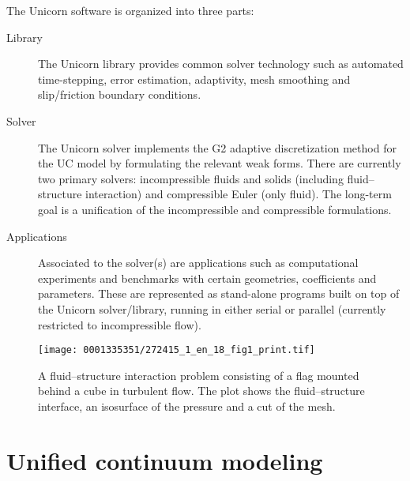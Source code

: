 
The Unicorn software is organized into three parts:
\begin{description}
\item[Library] The Unicorn library provides common solver technology
  such as automated time-stepping, error estimation, adaptivity, mesh
  smoothing and slip/friction boundary conditions.

\item[Solver] The Unicorn solver implements the G2 adaptive
  discretization method for the UC model by formulating the relevant
  weak forms. There are currently two primary solvers: incompressible
  fluids and solids (including fluid--structure interaction) and
  compressible Euler (only fluid). The long-term goal is a
  unification of the incompressible and compressible formulations.

\item[Applications] Associated to the solver(s) are applications such
  as computational experiments and benchmarks with certain geometries,
  coefficients and parameters. These are represented as stand-alone
  programs built on top of the Unicorn solver/library, running in
  either serial or parallel (currently restricted to incompressible
  flow).
\end{description}


\begin{figure}[!t]
\centering
\texttt{[image: 0001335351/272415\_1\_en\_18\_fig1\_print.tif]}
\caption{A fluid--structure interaction problem consisting of a flag
    mounted behind a cube in turbulent flow. The plot shows the
    fluid--structure interface, an isosurface of the pressure and a
    cut of the mesh.}\label{fig:flag3D}\vspace*{10pt}
\end{figure}


\label{chapter:implementation:unicorn}

\section{Unified continuum modeling}


